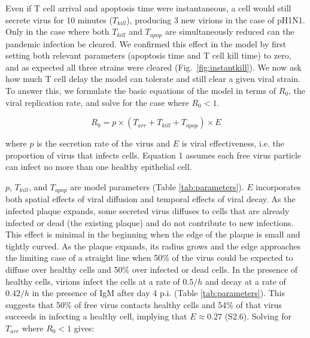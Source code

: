 \documentclass[10pt]{article}
\begin{document}
Even if T cell arrival and apoptosis time were instantaneous, a cell would still secrete virus for 10 minutes ($T_{kill}$), producing 3 new virions in the case of pH1N1.  Only in the case where both $T_{kill}$ and $T_{apop}$ are simultaneously reduced can the pandemic infection be cleared.  We confirmed this effect in the model by first setting both relevant parameters (apoptosis time and T cell kill time) to zero, and as expected all three strains were cleared (Fig.~\ref{fig:instantkill}).  We now ask how much T cell delay the model can tolerate and still clear a given viral strain.  To answer this, we formulate the basic equations of the model in terms of $R_0$, the viral replication rate, and solve for the case where $R_0 < 1$.

\begin{equation}
R_0 = p \times (T_{arr} + T_{kill} + T_{apop}) \times E
\end{equation}

\noindent where $p$ is the secretion rate of the virus and $E$ is viral effectiveness, i.e. the proportion of virus that infects cells.  Equation 1 assumes each free virus particle can infect no more than one healthy epithelial cell.



$p$, $T_{kill}$, and $T_{apop}$ are model parameters (Table \ref{tab:parameters}).  $E$ incorporates both spatial effects of viral diffusion and temporal effects of viral decay.  As the infected plaque expands, some secreted virus diffuses to cells that are already infected or dead (the existing plaque) and do not contribute to new infections.  This effect is minimal in the beginning when the edge of the plaque is small and tightly curved.  As the plaque expands, its radius grows and the edge approaches the limiting case of a straight line when 50\% of the virus could be expected to diffuse over healthy cells and 50\% over infected or dead cells.  In the presence of healthy cells, virions infect the cells at a rate of $0.5/h$ and decay at a rate of $0.42/h$ in the presence of IgM after day 4 p.i.  (Table \ref{tab:parameters}).  This suggests that 50\% of free virus contacts healthy cells and 54\% of that virus succeeds in infecting a healthy cell, implying that $E \approx 0.27$ (S2.6).  Solving for $T_{arr}$ where $R_0 < 1$ gives:
\end{document}

